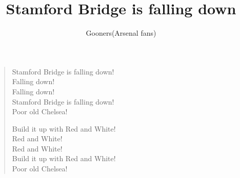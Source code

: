 \documentclass[a4paper,12pt]{article}
\title{Stamford Bridge is falling down}
\author{Gooners(Arsenal fans)}
\date{}
\begin{document}
	
	\maketitle
	
	\begin{verse}
		
		Stamford Bridge is falling down! \\
		Falling down! \\
		Falling down! \\
		Stamford Bridge is falling down! \\
		Poor old Chelsea!\par
		Build it up with Red and White! \\
		Red and White! \\
		Red and White! \\
		Build it up with Red and White! \\
		Poor old Chelsea!
		
	\end{verse}
	
\end{document}
